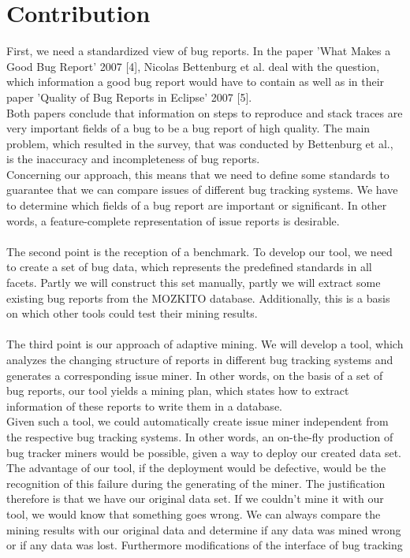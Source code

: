 \section{Contribution}
\label{Contribution}
First, we need a standardized view of bug reports. In the paper 'What Makes a Good Bug Report' 2007 [4], Nicolas Bettenburg et al. deal with the question, which information a good bug report would have to contain as well as in their paper 'Quality of Bug Reports in Eclipse' 2007 [5]. \\ Both papers conclude that information on steps to reproduce and stack traces are very important fields of a bug to be a bug report of high quality. The main problem, which resulted in the survey, that was conducted by Bettenburg et al., is the inaccuracy and incompleteness of bug reports. \\ Concerning our approach, this means that we need to define some standards to guarantee that we can compare issues of different bug tracking systems. We have to determine which fields of a bug report are important or significant. In other words, a feature-complete representation of issue reports is desirable. \\ \\ The second point is the reception of a benchmark. To develop our tool, we need to create a set of bug data, which represents the predefined standards in all facets. Partly we will construct this set manually, partly we will extract some existing bug reports from the MOZKITO database. Additionally, this is a basis on which other tools could test their mining results. \\ \\ The third point is our approach of adaptive mining. We will develop a tool, which analyzes the changing structure of reports in different bug tracking systems and generates a corresponding issue miner.  In other words, on the basis of a set of bug reports, our tool yields a mining plan, which states how to extract information of these reports to write them in a database. \\ Given such a tool, we could automatically create issue miner independent from the respective bug tracking systems. In other words, an on-the-fly production of bug tracker miners would be possible, given a way to deploy our created data set. The advantage of our tool, if the deployment would be defective, would be the recognition of this failure during the generating of the miner. The justification therefore is that we have our original data set. If we couldn't mine it with our tool, we would know that something goes wrong. We can always compare the mining results with our original data and determine if any data was mined wrong or if any data was lost. Furthermore modifications of the interface of bug tracking 